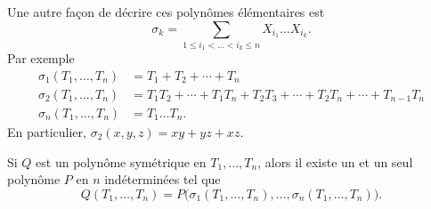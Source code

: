 Une autre façon de décrire ces polynômes élémentaires est
\begin{equation}
	\sigma_k=\sum_{1\leq i_1<\ldots<i_k\leq n}X_{i_1}\ldots X_{i_k}.
\end{equation}
Par exemple
\begin{subequations}
	\begin{align}
		\sigma_1(T_1,\ldots, T_n) & =T_1+T_2+\cdots +T_n                                            \\
		\sigma_2(T_1,\ldots, T_n) & =T_1T_2+\cdots +T_1T_n+T_2T_3+\cdots +T_2T_n+\cdots +T_{n-1}T_n \\
		\sigma_n(T_1,\ldots, T_n) & =T_1\ldots T_n.
	\end{align}
\end{subequations}
En particulier, \( \sigma_2(x,y,z)=xy+yz+xz\).

\begin{theorem}  \label{TholReBiw}
	Si \( Q\) est un polynôme symétrique en \( T_1,\ldots, T_n\), alors il existe un et un seul polynôme \( P\) en \( n\) indéterminées tel que
	\begin{equation}
		Q(T_1,\ldots, T_n)=P\big( \sigma_1(T_1,\ldots, T_n),\ldots, \sigma_n(T_1,\ldots, T_n) \big).
	\end{equation}
\end{theorem}

